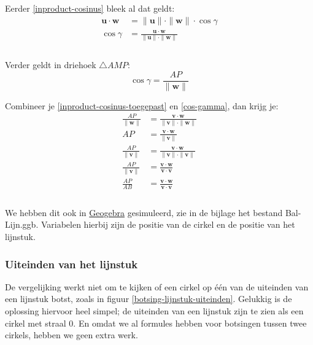 \documentclass[12pt,a4paper]{article}
\begin{document}
	Eerder \eqref{inproduct-cosinus} bleek al dat geldt:
	\begin{equation}
		\label{inproduct-cosinus-toegepast}
		\begin{aligned}
			\mathbf{u} \cdot \mathbf{w} &= \|\mathbf{u}\| \cdot \|\mathbf{w}\| \cdot \cos\gamma \\
			\cos\gamma &= \frac{\mathbf{u} \cdot \mathbf{w}}{\|\mathbf{u}\| \cdot \|\mathbf{w}\|}\\
		\end{aligned}
	\end{equation}
	\\Verder geldt in driehoek $\triangle AMP$:
	\begin{equation}
		\label{cos-gamma}
		\cos\gamma = \frac{AP}{\|\mathbf{w}\|}
	\end{equation}

	Combineer je \eqref{inproduct-cosinus-toegepast} en \eqref{cos-gamma}, dan krijg je:
	\begin{equation}
		\begin{aligned}
		\frac{AP}{\|\mathbf{w}\|} &= \frac{\mathbf{v} \cdot \mathbf{w}}{\|\mathbf{v}\| \cdot \|\mathbf{w}\|} \\
		                       AP &= \frac{\mathbf{v} \cdot \mathbf{w}}{\|\mathbf{v}\|} \\
		\frac{AP}{\|\mathbf{v}\|} &= \frac{\mathbf{v} \cdot \mathbf{w}}{\|\mathbf{v}\| \cdot \|\mathbf{v}\|} \\
		\frac{AP}{\|\mathbf{v}\|} &= \frac{\mathbf{v} \cdot \mathbf{w}}{\mathbf{v} \cdot \mathbf{v}}\\
		\frac{AP}{AB} &= \frac{\mathbf{v} \cdot \mathbf{w}}{\mathbf{v} \cdot \mathbf{v}}\\
		\end{aligned}
	\end{equation}
	\\We hebben dit ook in \href{http://www.geogebra.org/webstart/geogebra.html}{Geogebra} gesimuleerd, zie in de bijlage het bestand Bal-Lijn.ggb. Variabelen hierbij zijn de positie van de cirkel en de positie van het lijnstuk.
	
	\subsubsection{Uiteinden van het lijnstuk}
	De vergelijking werkt niet om te kijken of een cirkel op \'{e}\'{e}n van de uiteinden van een lijnstuk botst, zoals in figuur \ref{botsing-lijnstuk-uiteinden}. Gelukkig is de oplossing hiervoor heel simpel; de uiteinden van een lijnstuk zijn te zien als een cirkel met straal 0. En omdat we al formules hebben voor botsingen tussen twee cirkels, hebben we geen extra werk.
	
\end{document}
